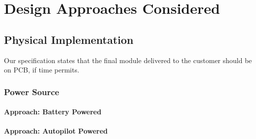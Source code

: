 \chapter{Design Approaches Considered}











\section{Physical Implementation}

Our specification states that the final module delivered to the customer 
should be on PCB, if time permits. 
	
\subsection{Power Source}

\subsubsection{Approach: Battery Powered}

\subsubsection{Approach: Autopilot Powered}

